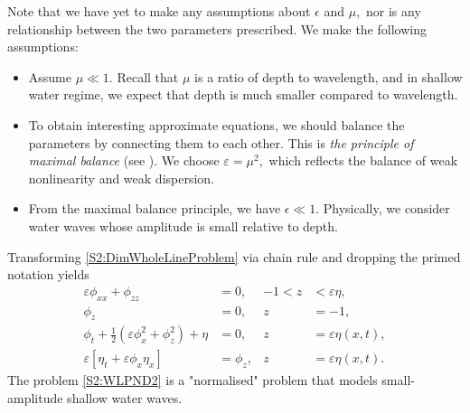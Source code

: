 Note that we have yet to make any assumptions about $\epsilon$ and $\mu,$ nor is any relationship between the two parameters prescribed. We make the following assumptions:
\begin{itemize}
\item Assume $\mu \ll 1.$ Recall that $\mu$ is a ratio of depth to wavelength, and in shallow water regime, we expect that depth is much smaller compared to wavelength.
\item To obtain interesting approximate equations, we should balance the parameters by connecting them to each other. This is \textit{the principle of maximal balance} (see \cite{Kruskal1963}). We choose $\varepsilon = \mu^2,$ which reflects the balance of weak nonlinearity and weak dispersion.
\item From the maximal balance principle, we have $\epsilon \ll 1.$ Physically, we consider water waves whose amplitude is small relative to depth.
\end{itemize}
Transforming \eqref{S2:DimWholeLineProblem} via chain rule and dropping the primed notation yields 
\begin{subequations}\label{S2:WLPND2}
\begin{align}
\label{S2:PDEND2}  \varepsilon\phi_{xx} + \phi_{zz} &= 0, &-1 <z &< \varepsilon\eta, \\
\label{S2:BC1ND2} \phi_z &= 0, &z &= -1,  \\ 
\label{S2:BC2ND2} \phi_{t} + \frac{1}{2} \left(\varepsilon\phi_{x}^2 + \phi_{z}^2\right) + \eta &= 0, &z &= \varepsilon\eta(x,t),\\
\label{S2:BC3ND2} \varepsilon\left[\eta_{t} + \varepsilon \phi_{x} \eta_{x}\right] &= \phi_{z}, &z &= \varepsilon\eta(x,t).
\end{align}
\end{subequations}
The problem \eqref{S2:WLPND2} is a "normalised" problem that models small-amplitude shallow water waves.


